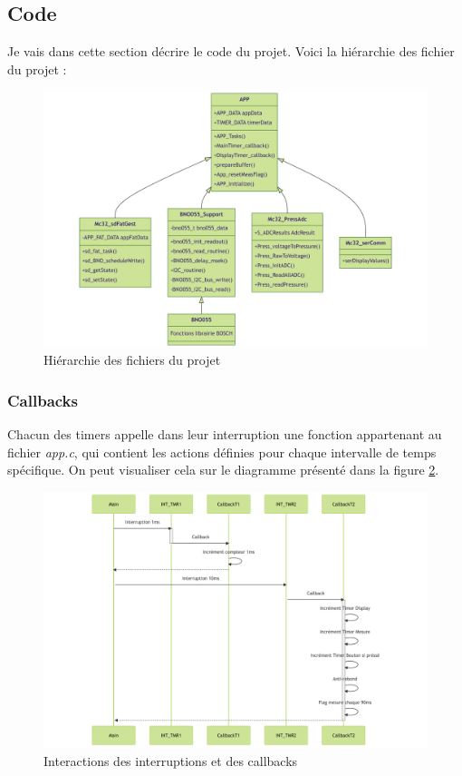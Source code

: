 {	\subsection{Code}
	Je vais dans cette section décrire le code du projet. Voici la hiérarchie des fichier du projet :
	\begin{figure}[h]
		\centering
		\includegraphics[width=0.79\linewidth]{Figures/Dev-SOFT/ClassesCode}
		\caption{Hiérarchie des fichiers du projet}
		\label{fig:classescode}
	\end{figure}
	
	\clearpage	
	
	\subsubsection{Callbacks}
	{
	Chacun des timers appelle dans leur interruption une fonction appartenant au fichier \textit{app.c}, qui contient les actions définies pour chaque intervalle de temps spécifique. On peut visualiser cela sur le diagramme présenté dans la figure \ref{fig:callbacks}.
	
	\begin{figure}[h!]
		\centering
		\includegraphics[width=1\textwidth]{Figures/Dev-SOFT/Callbacks}
		\caption{Interactions des interruptions et des callbacks}
		\label{fig:callbacks}
	\end{figure}

}}
